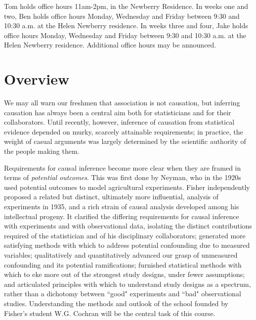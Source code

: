 \documentclass[12pt]{article}
\begin{document}
Tom holds office hours 11am-2pm, in the Newberry Residence. %
In weeks one and two, Ben holds office hours Monday, Wednesday and
Friday between 9:30 and 10:30 a.m.
at the Helen Newberry
residence. %
In weeks three and four, Jake holds
office hours Monday, Wednesday and Friday between 9:30 and 10:30 a.m. at the
Helen Newberry residence. Additional office hours may be
announced. 

\clearpage

\nobibliography*


\section{Overview}
We may all warn our freshmen that association is not causation, but inferring causation has always been a central aim both for statisticians and for their collaborators. Until recently, however, inference of causation from statistical evidence depended on murky, scarcely attainable requirements; in practice, the weight of casual arguments was largely determined by the scientific authority of the people making them.

Requirements for causal inference become more clear when they are
framed in terms of \emph{potential outcomes}.  This was first done by
Neyman, who in the 1920s used potential outcomes to model agricultural
experiments.  Fisher independently proposed a related but distinct,
ultimately more influential, analysis of experiments in 1935, and a
rich strain of causal analysis developed among his intellectual
progeny.  It clarified the differing requirements for causal inference
with experiments and with observational data, isolating the distinct
contributions required of the statistician and of his disciplinary
collaborators; generated more satisfying methods with which to address
potential confounding due to measured variables; qualitatively and
quantitatively advanced our grasp of unmeasured confounding and its
potential ramifications; furnished statistical methods with which to
eke more out of the strongest study designs, under fewer assumptions;
and articulated principles with which to understand study designs as a
spectrum, rather than a dichotomy between ``good" experiments and
``bad" observational studies. Understanding the methods and outlook of
the school founded by Fisher's student W.G. Cochran will be the
central task of this course.
\end{document}
